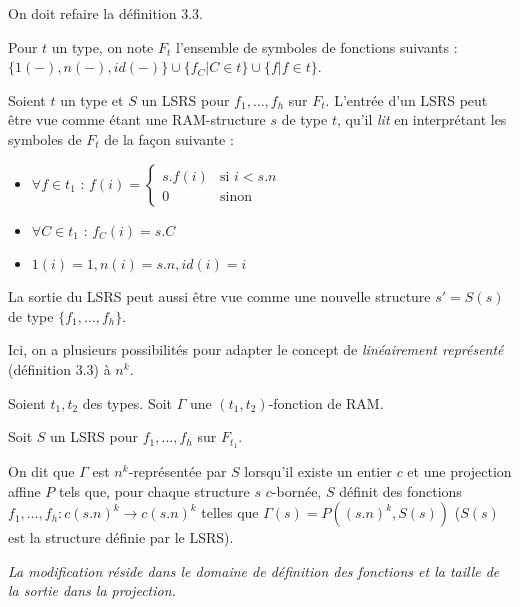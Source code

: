 \documentclass{article}
\begin{document}
		On doit refaire la définition 3.3.
		
		Pour $t$ un type, on note $F_t$ l'ensemble de symboles de fonctions suivants : $\{1(-), n(-), id(-)\} \cup  \{ f_C | C \in t\} \cup \{ f | f \in t\}$.
		
		\begin{remark}
			Soient $t$ un type et $S$ un LSRS pour $f_1, \dots, f_h$ sur $F_{t}$. 
			L'entrée d'un LSRS peut être vue comme étant une RAM-structure $s$ de type $t$, qu'il \emph{lit} en interprétant les symboles de $F_t$ de la façon suivante : 
			
			\begin{itemize}
				\item 	$\forall f \in t_1$ :   $f(i) = 
				\left\lbrace \begin{array}{ll}
				s.f(i) & \text{si } i< s.n \\
				0 & \text{sinon}
				\end{array}\right.$
				
				\item 	$\forall C \in t_1$ :   $f_C(i) = s.C$
				\item 	$1(i) = 1, n(i) = s.n, id(i) = i$
			\end{itemize}
			
			La sortie du LSRS peut aussi être vue comme une nouvelle structure $s' = S(s)$ de type $\{f_1, \dots, f_h\}$.
		\end{remark}
		
		
		Ici, on a plusieurs possibilités pour adapter le concept de \emph{linéairement représenté} (définition 3.3) à $n^k$.
		
		\begin{definition}
			Soient $t_1, t_2$ des types. Soit $\Gamma$ une $(t_1, t_2)$-fonction de RAM. 
			
			Soit $S$ un LSRS pour $f_1, \dots, f_h$ sur $F_{t_1}$. 
			
			On dit que $\Gamma$ est $n^k$-représentée par $S$ lorsqu'il existe un entier $c$ et une projection affine $P$ tels que, pour chaque structure $s$ $c$-bornée, $S$ définit des fonctions $f_1, \dots, f_h : c (s.n)^k \to c (s.n)^k$ telles que $\Gamma(s) = P((s.n)^k, S(s))$ ($S(s)$ est la structure définie par le LSRS).
			
			\emph{La modification réside dans le domaine de définition des fonctions et la taille de la sortie dans la projection.}
		\end{definition}
			
\end{document}
